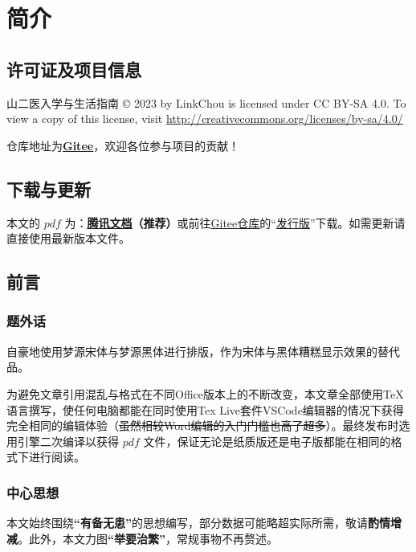\chapter[简介]{简介}

\section[许可证及项目信息]{许可证及项目信息}
山二医入学与生活指南 © 2023 by LinkChou is licensed under CC BY-SA 4.0. To view a copy of this license, visit \uline{\href{http://creativecommons.org/licenses/by-sa/4.0/}{http://creativecommons.org/licenses/by-sa/4.0/}}

仓库地址为\textbf{\uline{\href{https://gitee.com/mikazo/guide_for_freshman}{Gitee}}}，欢迎各位参与项目的贡献！

\section[\textcolor{red}{下载与更新}]{下载与更新}
本文的 $pdf$ \textbf{}为：\textbf{\uline{\textcolor{red}{\href{https://docs.qq.com/s/ETcQ-ZFSrSsh6MK9bm773q}{腾讯文档}}}（推荐）}或前往\uline{\href{https://gitee.com/mikazo/guide_for_freshman}{Gitee仓库}}的“\uline{\href{https://gitee.com/mikazo/latex_version/releases/latest}{发行版}}”下载。如需更新请直接使用最新版本文件。

\section[前言]{前言}
\subsection[题外话]{题外话}
自豪地使用梦源宋体与梦源黑体进行排版，作为宋体与黑体糟糕显示效果的替代品。

为避免文章引用混乱与格式在不同Office版本上的不断改变，本文章全部使用\TeX 语言撰写，使任何电脑都能在同时使用Tex Live套件VSCode编辑器\footnotemark 的情况下获得完全相同的编辑体验（\sout{虽然相较Word编辑的入门门槛也高了超多}）。最终发布时选用\XeLaTeX 引擎二次编译以获得 $pdf$ 文件，保证无论是纸质版还是电子版都能在相同的格式下进行阅读。

\subsection[中心思想]{中心思想}
本文始终围绕\textbf{“有备无患”}的思想编写，部分数据可能略超实际所需，敬请\textbf{酌情增减}。此外，本文力图\textbf{“举要治繁”}，常规事物不再赘述。

